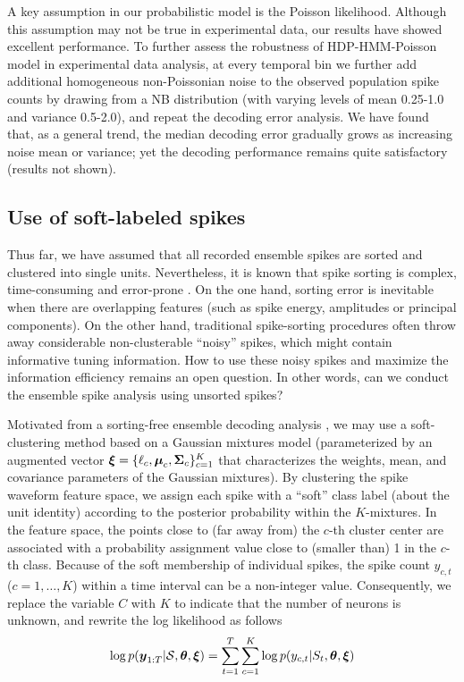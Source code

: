 A key assumption in our probabilistic model is the Poisson
likelihood. Although this assumption may not be true in experimental
data, our results have showed excellent performance.  To further
assess the robustness of HDP-HMM-Poisson model in experimental data
analysis, at every temporal bin we further add additional homogeneous
non-Poissonian noise to the observed population spike counts by
drawing from a NB distribution (with varying levels of mean 0.25-1.0
and variance 0.5-2.0), and repeat the decoding error analysis. We have
found that, as a general trend, the median decoding error gradually
grows as increasing noise mean or variance; yet the decoding
performance remains quite satisfactory (results not shown).



\subsection{Use of soft-labeled spikes}


Thus far, we have assumed that all recorded ensemble spikes are sorted
and clustered into single units. Nevertheless, it is known that spike
sorting is complex, time-consuming and error-prone
\citep{Wood08,Shalchyan14}.  On the one hand, sorting error is
inevitable when there are overlapping features (such as spike energy,
amplitudes or principal components).  On the other hand, traditional
spike-sorting procedures often throw away considerable non-clusterable
``noisy'' spikes, which might contain informative tuning
information. How to use these noisy spikes and maximize the
information efficiency remains an open question.  In other words, can
we conduct the ensemble spike analysis using unsorted spikes?


Motivated from a sorting-free ensemble decoding analysis
\citep{Chen12b,Kloosterman14}, we may use a soft-clustering method
based on a Gaussian mixtures model (parameterized by an augmented
vector $\boldsymbol{\xi}=\{\ell_c,\boldsymbol{\mu}_c,\boldsymbol{\Sigma}_c\}_{c=1}^K$ that characterizes
the weights, mean, and covariance parameters of the Gaussian
mixtures). By clustering the spike waveform feature space, we assign
each spike with a ``soft'' class label (about the unit identity)
according to the posterior probability within the $K$-mixtures. In the
feature space, the points close to (far away from) the $c$-th cluster
center are associated with a probability assignment value close to
(smaller than) 1 in the $c$-th class. Because of the soft membership
of individual spikes, the spike count $y_{c,t}$ ($c = 1,\dots, K$)
within a time interval can be a non-integer value. Consequently, we
replace the variable $C$ with $K$ to indicate that the number of
neurons is unknown, and rewrite the log likelihood as follows
\begin{eqnarray}                                   
\log p({\boldsymbol{y}}_{1:T}|\mathcal{S},\boldsymbol{\theta},\boldsymbol{\xi})= \sum_{t=1}^T \sum_{c=1}^K \log p(y_{c,t}|S_t,\boldsymbol{\theta},\boldsymbol{\xi})
\end{eqnarray}

